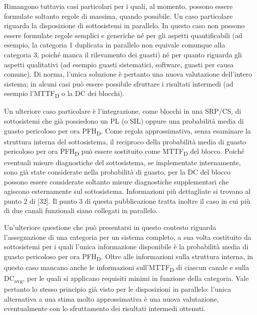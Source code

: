 Rimangono tuttavia casi particolari per i quali, al momento, possono essere formulate soltanto regole di massima, quando possibile. Un caso particolare riguarda la disposizione di sottosistemi in parallelo. In questo caso non possono essere formulate regole semplici e generiche né per gli aspetti quantificabili (ad esempio, la categoria 1 duplicata in parallelo non equivale comunque alla categoria 3, poiché manca il rilevamento dei guasti) né per quanto riguarda gli aspetti qualitativi (ad esempio guasti sistematici, software, guasti per causa comune). Di norma, l'unica soluzione è pertanto una nuova valutazione dell'intero sistema; in alcuni casi può essere possibile sfruttare i risultati intermedi (ad esempio l'MTTF\textsubscript{D} o la DC dei blocchi).

\begin{center}
    \begin{minipage}{\textwidth}
        \centering
        \captionsetup{hypcap=false}
        \resizebox{0.6\textwidth}{!}{}
        \label{fig:06-14}
    \end{minipage}
\end{center}

Un ulteriore caso particolare è l'integrazione, come blocchi in una SRP/CS, di sottosistemi che già possiedono un PL (o SIL) oppure una probabilità media di guasto pericoloso per ora PFH\textsubscript{D}. Come regola approssimativa, senza esaminare la struttura interna del sottosistema, il reciproco della probabilità media di guasto pericoloso per ora PFH\textsubscript{D} può essere sostituito come MTTF\textsubscript{D} del blocco. Poiché eventuali misure diagnostiche del sottosistema, se implementate internamente, sono già state considerate nella probabilità di guasto, per la DC del blocco possono essere considerate soltanto misure diagnostiche supplementari che agiscono esternamente sul sottosistema. Informazioni più dettagliate si trovano al punto 2 di [32]. Il punto 3 di questa pubblicazione tratta inoltre il caso in cui più di due canali funzionali siano collegati in parallelo.

Un'ulteriore questione che può presentarsi in questo contesto riguarda l'assegnazione di una categoria per un sistema completo, a sua volta costituito da sottosistemi per i quali l'unica informazione disponibile è la probabilità media di guasto pericoloso per ora PFH\textsubscript{D}. Oltre alle informazioni sulla struttura interna, in questo caso mancano anche le informazioni sull'MTTF\textsubscript{D} di ciascun canale e sulla DC\textsubscript{avg}, per le quali si applicano requisiti minimi in funzione della categoria. Vale pertanto lo stesso principio già visto per le disposizioni in parallelo: l'unica alternativa a una stima molto approssimativa è una nuova valutazione, eventualmente con lo sfruttamento dei risultati intermedi ottenuti.

